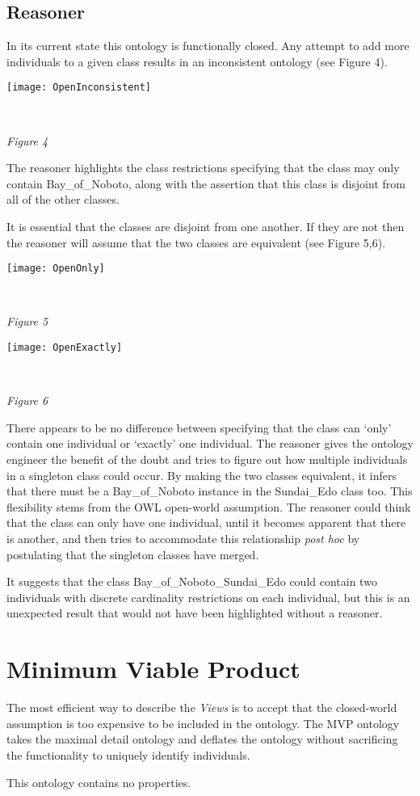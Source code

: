 \documentclass[titlepage,a4paper,12pt,oneside]{book}
\begin{document}
\subsection{Reasoner}
In its current state this ontology is functionally closed.
Any attempt to add more individuals to a given class results in an inconsistent ontology (see Figure 4).
\newline
\centerline{\texttt{[image: OpenInconsistent]}}\\
\centerline{\textit{Figure 4}}
\newline
The reasoner highlights the class restrictions specifying that the class may only contain Bay\_of\_Noboto, along with the assertion that this class is disjoint from all of the other classes.\par
It is essential that the classes are disjoint from one another.
If they are not then the reasoner will assume that the two classes are equivalent (see Figure 5,6).
\newline
\centerline{\texttt{[image: OpenOnly]}}\\
\centerline{\textit{Figure 5}}
\newline
\centerline{\texttt{[image: OpenExactly]}}\\
\centerline{\textit{Figure 6}}
\newline
There appears to be no difference between specifying that the class can `only' contain one individual or `exactly' one individual.
The reasoner gives the ontology engineer the benefit of the doubt and tries to figure out how multiple individuals in a singleton class could occur.
By making the two classes equivalent, it infers that there must be a Bay\_of\_Noboto instance in the Sundai\_Edo class too.
This flexibility stems from the OWL open-world assumption.
The reasoner could think that the class can only have one individual, until it becomes apparent that there is another, and then tries to accommodate this relationship \textit{post hoc} by postulating that the singleton classes have merged.\par
It suggests that the class Bay\_of\_Noboto\_Sundai\_Edo could contain two individuals with discrete cardinality restrictions on each individual, but this is an unexpected result that would not have been highlighted without a reasoner.

\section{Minimum Viable Product}
The most efficient way to describe the \textit{Views} is to accept that the closed-world assumption is too expensive to be included in the ontology.
The MVP ontology takes the maximal detail ontology and deflates the ontology without sacrificing the functionality to uniquely identify individuals.\par
This ontology contains no properties.
\end{document}
